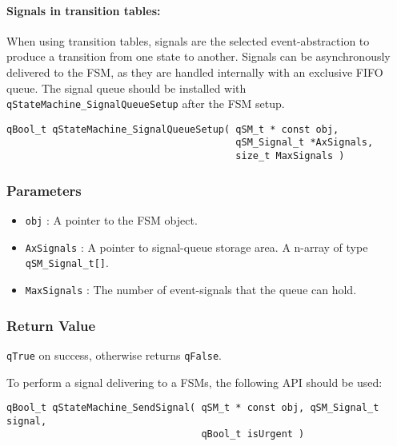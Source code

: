 \paragraph{Signals in transition tables:}
When using transition tables, signals are the selected event-abstraction to produce a transition from one state to another. Signals can be asynchronously delivered to the FSM, as they are handled internally with an exclusive FIFO queue. 
The signal queue should be installed with \lstinline{qStateMachine_SignalQueueSetup} after the FSM setup. \\

\begin{lstlisting}[style=CStyle]
qBool_t qStateMachine_SignalQueueSetup( qSM_t * const obj, 
                                        qSM_Signal_t *AxSignals, 
                                        size_t MaxSignals )
\end{lstlisting} 

\subsubsection*{Parameters}
\begin{itemize}
    \item \lstinline{obj} : A pointer to the FSM object. 
    \item \lstinline{AxSignals} : A pointer to signal-queue storage area. A n-array of type \lstinline{qSM_Signal_t[]}.
    \item \lstinline{MaxSignals} : The number of event-signals that the queue can hold.
\end{itemize}

\subsubsection*{Return Value}
\lstinline{qTrue} on success, otherwise returns \lstinline{qFalse}.

\hrulefill
\newline

To perform a signal delivering to a FSMs, the following API should be used: \\

\begin{lstlisting}[style=CStyle]
qBool_t qStateMachine_SendSignal( qSM_t * const obj, qSM_Signal_t signal, 
                                  qBool_t isUrgent )
\end{lstlisting} 

